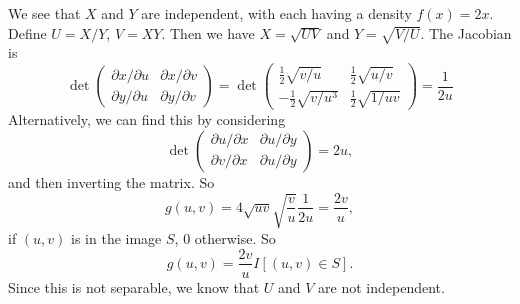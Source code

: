 \begin{note}
\begin{field}
\begin{eg}
      We see that $X$ and $Y$ are independent, with each having a density $f(x) = 2x$.
      Define $U = X/Y$, $V = XY$. Then we have $X = \sqrt{UV}$ and $Y = \sqrt{V/U}$.
      The Jacobian is
      \[
        \det
        \begin{pmatrix}
          \partial x/\partial u & \partial x/\partial v\\
          \partial y/\partial u & \partial y/\partial v
        \end{pmatrix}
        =
        \det
        \begin{pmatrix}
          \frac{1}{2}\sqrt{v/u} & \frac{1}{2}\sqrt{u/v}\\
          -\frac{1}{2}\sqrt{v/u^3} & \frac{1}{2}\sqrt{1/uv}
        \end{pmatrix}
        = \frac{1}{2u}
      \]
      Alternatively, we can find this by considering
      \[
        \det
        \begin{pmatrix}
          \partial u/\partial x & \partial u/\partial y\\
          \partial v/\partial x & \partial u/\partial y
        \end{pmatrix} = 2u,
      \]
      and then inverting the matrix. So
      \[
        g(u, v) = 4\sqrt{uv}\sqrt{\frac{v}{u}}\frac{1}{2u} = \frac{2v}{u},
      \]
      if $(u, v)$ is in the image $S$, $0$ otherwise. So
      \[
        g(u, v) = \frac{2v}{u}I[(u, v)\in S].
      \]
      Since this is not separable, we know that $U$ and $V$ are not independent.
    \end{eg}
  \end{field}
  \xplain{}%
\end{note}

